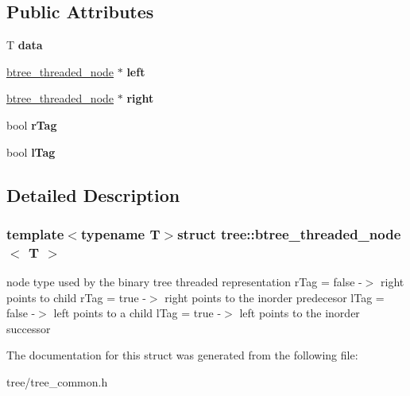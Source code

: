 \subsection*{\-Public \-Attributes}
\begin{DoxyCompactItemize}
\item 
\hypertarget{structtree_1_1btree__threaded__node_a4eedf9c4f0d905ca2163d37ddcb855be}{\-T {\bfseries data}}\label{structtree_1_1btree__threaded__node_a4eedf9c4f0d905ca2163d37ddcb855be}

\item 
\hypertarget{structtree_1_1btree__threaded__node_ae2f6a8e3479fc61c5cd635a649a2b0f0}{\hyperlink{structtree_1_1btree__threaded__node}{btree\-\_\-threaded\-\_\-node} $\ast$ {\bfseries left}}\label{structtree_1_1btree__threaded__node_ae2f6a8e3479fc61c5cd635a649a2b0f0}

\item 
\hypertarget{structtree_1_1btree__threaded__node_ad2ffcfc42ad38e941223e32995013b21}{\hyperlink{structtree_1_1btree__threaded__node}{btree\-\_\-threaded\-\_\-node} $\ast$ {\bfseries right}}\label{structtree_1_1btree__threaded__node_ad2ffcfc42ad38e941223e32995013b21}

\item 
\hypertarget{structtree_1_1btree__threaded__node_a06b2ebcf5e85dd9feb184872af4a6e30}{bool {\bfseries r\-Tag}}\label{structtree_1_1btree__threaded__node_a06b2ebcf5e85dd9feb184872af4a6e30}

\item 
\hypertarget{structtree_1_1btree__threaded__node_a1179a89253389e3c964653739394fbbd}{bool {\bfseries l\-Tag}}\label{structtree_1_1btree__threaded__node_a1179a89253389e3c964653739394fbbd}

\end{DoxyCompactItemize}


\subsection{\-Detailed \-Description}
\subsubsection*{template$<$typename T$>$struct tree\-::btree\-\_\-threaded\-\_\-node$<$ T $>$}

node type used by the binary tree threaded representation r\-Tag = false -\/$>$ right points to child r\-Tag = true -\/$>$ right points to the inorder predecesor l\-Tag = false -\/$>$ left points to a child l\-Tag = true -\/$>$ left points to the inorder successor 

\-The documentation for this struct was generated from the following file\-:\begin{DoxyCompactItemize}
\item 
tree/tree\-\_\-common.\-h\end{DoxyCompactItemize}
